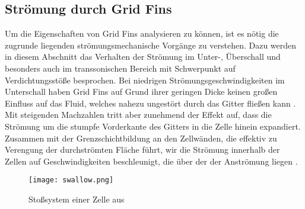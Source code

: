\subsection{Strömung durch Grid Fins}\label{stroe}
Um die Eigenschaften von Grid Fins analysieren zu können, ist es nötig die zugrunde liegenden strömungsmechanische Vorgänge zu verstehen. Dazu werden in diesem Abschnitt das Verhalten der Strömung im Unter-, Überschall und besonders auch im transsonischen Bereich mit Schwerpunkt auf Verdichtungsstöße besprochen.
Bei niedrigen Strömungsgeschwindigkeiten im Unterschall haben Grid Fins auf Grund ihrer geringen Dicke keinen großen Einfluss auf das Fluid, welches nahezu ungestört durch das Gitter fließen kann \cite{sb-sharp}. Mit steigenden Machzahlen tritt aber zunehmend der Effekt auf, dass die Strömung um die stumpfe Vorderkante des Gitters in die Zelle hinein expandiert. Zusammen mit der Grenzschichtbildung an den Zellwänden, die effektiv zu Verengung der durchströmten Fläche führt, wir die Strömung innerhalb der Zellen auf Geschwindigkeiten beschleunigt, die über der der Anströmung liegen \cite{synopsis}.
\begin{figure}[h]
	\centering
	\texttt{[image: swallow.png]}
	\caption{Stoßsystem einer Zelle aus \cite{synopsis}}
\end{figure}\\

